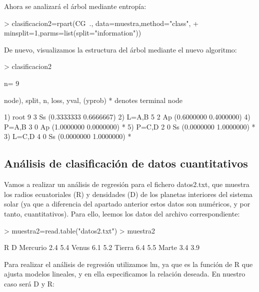 \documentclass [a4paper] {article}
\begin{document}
Ahora se analizará el árbol mediante entropía:

\begin{Schunk}
\begin{Sinput}
> clasificacion2=rpart(CG~., data=muestra,method="class",
+ minsplit=1,parms=list(split="information"))
\end{Sinput}
\end{Schunk}

De nuevo, visualizamos la estructura del árbol mediante el nuevo algoritmo:

\begin{Schunk}
\begin{Sinput}
> clasificacion2
\end{Sinput}
\begin{Soutput}
n= 9 

node), split, n, loss, yval, (yprob)
      * denotes terminal node

1) root 9 3 Ss (0.3333333 0.6666667)  
  2) L=A,B 5 2 Ap (0.6000000 0.4000000)  
    4) P=A,B 3 0 Ap (1.0000000 0.0000000) *
    5) P=C,D 2 0 Ss (0.0000000 1.0000000) *
  3) L=C,D 4 0 Ss (0.0000000 1.0000000) *
\end{Soutput}
\end{Schunk}

\subsection{Análisis de clasificación de datos cuantitativos}

Vamos a realizar un análisis de regresión para el fichero datos2.txt, que muestra los radios ecuatoriales
(R) y densidades (D) de los planetas interiores del sistema solar (ya que a diferencia del apartado anterior
estos datos son numéricos, y por tanto, cuantitativos). Para ello, leemos los datos del archivo correspondiente:

\begin{Schunk}
\begin{Sinput}
> muestra2=read.table("datos2.txt")
> muestra2
\end{Sinput}
\begin{Soutput}
           R   D
Mercurio 2.4 5.4
Venus    6.1 5.2
Tierra   6.4 5.5
Marte    3.4 3.9
\end{Soutput}
\end{Schunk}

Para realizar el análisis de regresión utilizamos lm, ya que es la función de R que ajusta modelos lineales,
y en ella especificamos la relación deseada. En nuestro caso será D y R:
\end{document}
